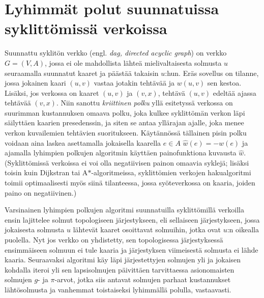 \documentclass[finnish]{tktltiki2}
\theoremstyle{definition}
\theoremstyle{remark}
\begin{document}
\section{Lyhimmät polut suunnatuissa syklittömissä verkoissa}
\label{sec:dag}
Suunnattu syklitön verkko (engl. \textit{dag, directed acyclic graph}) on verkko $G = (V, A)$, jossa ei ole mahdollista lähteä mielivaltaisesta solmusta $u$ seuraamalla suunnatut kaaret ja päästää takaisin $u$:hun. Eräs sovellus on tilanne, jossa jokainen kaari $(u, v)$ vastaa jotakin tehtävää ja $w(u, v)$ sen kestoa. Lisäksi, jos verkossa on kaaret $(u, v)$ ja $(v, x)$, tehtävä $(u, v)$ edeltää ajassa tehtävää $(v, x)$. Niin sanottu \textit{kriittinen polku} yllä esitetyssä verkossa on suurimman kustannuksen omaava polku, joka kulkee syklittömän verkon läpi säilyttäen kaarien presedenssin, ja siten se antaa yllärajan ajalle, joka menee verkon kuvailemien tehtävien suoritukseen. Käytännössä tällainen pisin polku voidaan aina laskea asettamalla jokaisella kaarella $e \in A$ $\hat{w}(e) = -w(e)$ ja ajamalla lyhimpien polkujen algoritmin käyttäen painofunktiona kuvausta $\hat{w}$. (Syklittömissä verkoissa ei voi olla negatiivisen painon omaavia syklejä; lisäksi toisin kuin Dijkstran tai A$\ast$-algoritmeissa, syklittömien verkojen hakualgoritmi toimii optimaalisesti myös siinä tilanteessa, jossa syöteverkossa on kaaria, joiden paino on negatiivinen.)

Varsinainen lyhimpien polkujen algoritmi suunnatuilla syklittömillä verkoilla ensin lajittelee solmut topologiseen järjestykseen, eli sellaiseen järjestykseen, jossa jokaisesta solmusta $u$ lähtevät kaaret osoittavat solmuihin, jotka ovat $u$:n oikealla puolella. Nyt jos verkko on yhdistetty, sen topologisessa järjestyksessä ensimmäiseen solmuun ei tule kaaria ja järjestyksen viimeisestä solmusta ei lähde kaaria. Seuraavaksi algoritmi käy läpi järjestettyjen solmujen yli ja jokaisen kohdalla iteroi yli sen lapsisolmujen päivittäen tarvittaessa asionomaisten solmujen $g$- ja $\pi$-arvot, jotka siis antavat solmujen parhaat kustannukset lähtösolmusta ja vanhemmat toistaiseksi lyhimmällä polulla, vastaavasti.
\end{document}
